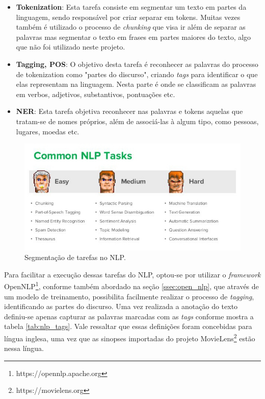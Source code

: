 \begin{itemize}
	\item{\textbf{Tokenization}: Esta tarefa consiste em segmentar um texto em partes da linguagem, sendo responsável por criar separar em tokens. Muitas vezes também é utilizado o processo de \textit{chunking} que visa ir além de separar as palavras mas segmentar o texto em frases em partes maiores do texto, algo que não foi utilizado neste projeto.}
	\item{\textbf{Tagging, \ac{POS}}: O objetivo desta tarefa é reconhecer as palavras do processo de tokenization como "partes do discurso", criando \textit{tags} para identificar o que elas representam na linguagem. Nesta parte é onde se classificam as palavras em verbos, adjetivos, substantivos, pontuações etc.}
	\item{\textbf{\ac{NER}}: Esta tarefa objetiva reconhecer nas palavras e tokens aquelas que tratam-se de nomes próprios, além de associá-las à algum tipo, como pessoas, lugares, moedas etc.}
\end{itemize}

\begin{figure}
	\centering
	\includegraphics[scale=0.70]{imagens/nlp.jpg}
	\caption{Segmentação de tarefas no NLP. \citep{NLP2016}}
	\label{fig:nlp}
\end{figure}

Para facilitar a execução dessas tarefas do \ac{NLP}, optou-se por utilizar o \textit{framework} OpenNLP\footnote{https://opennlp.apache.org}, conforme também abordado na seção \ref{ssec:open_nlp}, que através de um modelo de treinamento, possibilita facilmente realizar o processo de \textit{tagging}, identificando as partes do discurso. Uma vez realizada a anotação do texto definiu-se apenas capturar as palavras marcadas com as \textit{tags} conforme mostra a tabela \ref{tab:nlp_tags}. Vale ressaltar que essas definições foram concebidas para língua inglesa, uma vez que as sinopses importadas do projeto MovieLens\footnote{https://movielens.org} estão nessa língua.

